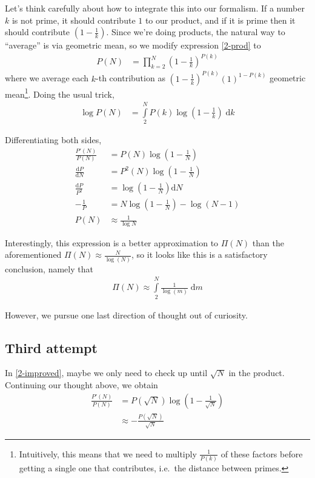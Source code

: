 \documentclass[12pt]{report}
\newcommand*{\rd}[2]{\frac{\mathrm{d}#1}{\mathrm{d}#2}}
\begin{document}
Let's think carefully about how to integrate this into our formalism. If a
number $k$ is not prime, it should contribute $1$ to our product, and if it is
prime then it should contribute $\left( 1 - \frac{1}{k} \right)$. Since we're
doing products, the natural way to ``average'' is via geometric mean, so we
modify expression \autoref{2-prod} to
\begin{align}
    P(N) &= \prod\limits_{k=2}^{N}\left( 1 - \frac{1}{k}
    \right)^{P(k)}\label{2-improved}
\end{align}
where we average each $k$-th contribution as $\left( 1 - \frac{1}{k}
\right)^{P(k)}(1)^{1-P(k)}$ geometric mean\footnote{Intuitively, this means that
we need to multiply $\frac{1}{P(k)}$ of these factors before getting a single
one that contributes, i.e.\ the distance between primes.}. Doing the usual trick,
\begin{align}
    \log P(N) &= \int\limits_{2}^{N}P(k) \log\left( 1 - \frac{1}{k}
    \right)\;\mathrm{d}k
\end{align}

Differentiating both sides,
\begin{align}
    \frac{P'(N)}{P(N)} &= P(N)\log\left( 1 - \frac{1}{N} \right)\\
    \rd{P}{N} &= P^2(N)\log\left( 1 - \frac{1}{N} \right)\\
    \frac{\mathrm{d}P}{P^2} &= \log\left( 1 - \frac{1}{N} \right)\mathrm{d}N\\
    -\frac{1}{P} &= N\log\left( 1 - \frac{1}{N} \right) - \log\left( N - 1
    \right)\\
    P(N) &\approx \frac{1}{\log N}
\end{align}

Interestingly, this expression is a better approximation to $\Pi(N)$ than the
aforementioned $\Pi(N) \approx \frac{N}{\log(N)}$, so it looks like this is a
satisfactory conclusion, namely that
\begin{align}
    \Pi(N) \approx \int\limits_{2}^{N}\frac{1}{\log(m)}\;\mathrm{d}m
\end{align}

However, we pursue one last direction of thought out of curiosity.

\subsection{Third attempt}

In \autoref{2-improved}, maybe we only need to check up until $\sqrt{N}$ in the
product. Continuing our thought above, we obtain
\begin{align}
    \frac{P'(N)}{P(N)} &= P(\sqrt{N})\log\left( 1 - \frac{1}{\sqrt{N}} \right)\\
    &\approx -\frac{P(\sqrt{N})}{\sqrt{N}}
\end{align}
\end{document}
